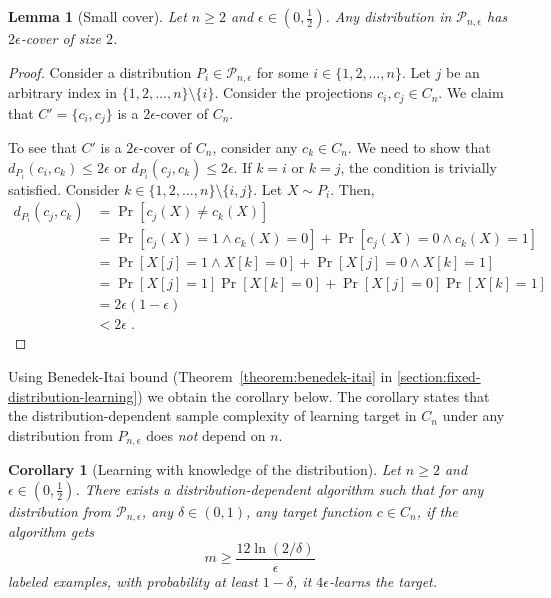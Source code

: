 \documentclass[11pt]{article}
\newtheorem{lemma}[proposition]{Lemma}
\newtheorem{corollary}[proposition]{Corollary}
\renewcommand{\P}{\mathcal{P}}
\begin{document}
\begin{lemma}[Small cover]
Let $n \ge 2$ and $\epsilon \in (0,\frac{1}{2})$. Any distribution in $\P_{n,\epsilon}$
has $2\epsilon$-cover of size $2$.
\end{lemma}

\begin{proof}
Consider a distribution $P_i \in \P_{n,\epsilon}$ for some $i \in \{1,2,\dots,n\}$.
Let $j$ be an arbitrary index in $\{1,2,\dots,n\} \setminus \{i\}$.
Consider the projections $c_i, c_j \in C_n$. We claim that $C' = \{c_i, c_j\}$
is a $2\epsilon$-cover of $C_n$.

To see that $C'$ is a $2\epsilon$-cover of $C_n$, consider any $c_k \in C_n$.
We need to show that $d_{P_i}(c_i, c_k) \le 2\epsilon$ or $d_{P_i}(c_j, c_k)
\le 2\epsilon$. If $k = i$ or $k = j$, the condition is trivially satisfied.
Consider $k \in \{1,2,\dots,n\} \setminus \{i,j\}$. Let $X \sim P_i$. Then,
\begin{align*}
d_{P_i}(c_j, c_k)
& = \Pr[c_j(X) \neq c_k(X)] \\
& = \Pr[c_j(X) = 1 \wedge c_k(X) = 0] + \Pr[c_j(X) = 0 \wedge c_k(X) = 1] \\
& = \Pr[X[j] = 1 \wedge X[k] = 0]   + \Pr[X[j] = 0 \wedge X[k] = 1] \\
& = \Pr[X[j] = 1] \Pr[X[k] = 0]  + \Pr[X[j] = 0] \Pr[X[k] = 1] \\
& = 2 \epsilon \left( 1 - \epsilon \right)  \\
& < 2 \epsilon \; .
\end{align*}
\end{proof}

Using Benedek-Itai bound (Theorem~\ref{theorem:benedek-itai} in
\autoref{section:fixed-distribution-learning}) we obtain the corollary below.
The corollary states that the distribution-dependent sample complexity
of learning target in $C_n$ under any distribution from $P_{n,\epsilon}$
does \emph{not} depend on $n$.

\begin{corollary}[Learning with knowledge of the distribution]
Let $n \ge 2$ and $\epsilon \in (0,\frac{1}{2})$.  There exists a
distribution-dependent algorithm such that for any distribution from $\P_{n,\epsilon}$,
any $\delta \in (0,1)$, any target function $c \in C_n$, if the algorithm gets
$$
m \ge \frac{12\ln(2/\delta)}{\epsilon}
$$
labeled examples, with
probability at least $1 - \delta$, it $4\epsilon$-learns the target.
\end{corollary}
\end{document}
